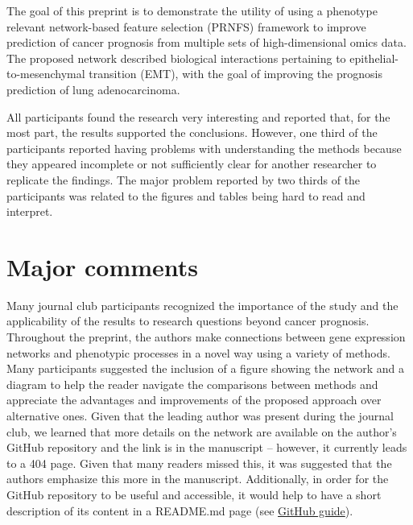 \documentclass[10pt]{article}
\begin{document}
The goal of this preprint is to demonstrate the utility of using a
phenotype relevant network-based feature selection (PRNFS) framework to
improve prediction of cancer prognosis from multiple sets of
high-dimensional omics data. The proposed network described biological
interactions pertaining to epithelial-to-mesenchymal transition (EMT),
with the goal of improving the prognosis prediction of lung
adenocarcinoma.

\par\null

All participants found the research very interesting and reported that,
for the most part, the results supported the conclusions. However, one
third of the participants reported having problems with understanding
the methods because they appeared incomplete or not sufficiently clear
for another researcher to replicate the findings. The major problem
reported by two thirds of the participants was related to the figures
and tables being hard to read and interpret.

\par\null

\section*{Major comments}

{\label{910645}}

Many journal club participants recognized the importance of the study
and the applicability of the results to research questions beyond cancer
prognosis. Throughout the preprint, the authors make connections between
gene expression networks and phenotypic processes in a novel way using a
variety of methods. Many participants suggested the inclusion of a
figure showing the network and a diagram to help the reader navigate the
comparisons between methods and appreciate the advantages and
improvements of the proposed approach over alternative ones. Given that
the leading author was present during the journal club, we learned that
more details on the network are available on the author's GitHub
repository and the link is in the manuscript -- however, it currently
leads to a 404 page. Given that many readers missed this, it was
suggested that the authors emphasize this more in the manuscript.
Additionally, in order for the GitHub repository to be useful and
accessible, it would help to have a short description of its content in
a README.md page (see
\href{https://guides.github.com/features/wikis/}{GitHub guide}).
\end{document}
